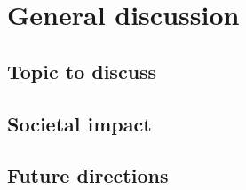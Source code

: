 \chapter[General discussion]{General discussion}
\label{cha:chapter7}
\newpage

\lipsum[1]

\section{Topic to discuss}\label{sec:discussion_topic}
\lipsum[2-3]

\section{Societal impact}\label{sec:societal_impact}
\lipsum[4-6]

\section{Future directions}\label{sec:future_directions}
\lipsum[7-8]